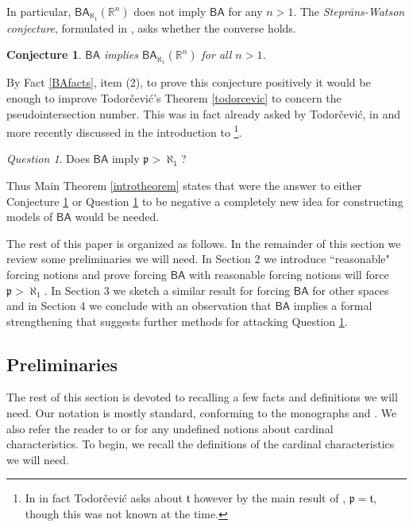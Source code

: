 \documentclass[leqno,11pt]{amsart}
\newtheorem{conjecture}{Conjecture}[section]
\theoremstyle{definition}
\theoremstyle{remark}
\newtheorem{question}{Question}
\def\BA{\mathsf{BA}}
\def\mfp{\mathfrak{p}}
\begin{document}
In particular, $\BA_{\aleph_1} (\mathbb R^n)$ does not imply $\BA$ for any $n > 1$. The {\em Stepr\=ans-Watson conjecture}, formulated in \cite{Stepranswatson87}, asks whether the converse holds.
\begin{conjecture} \label{conjecture}
  $\BA$ implies $\BA_{\aleph_1}(\mathbb R^n)$ for all $n > 1$. 
\end{conjecture}

By Fact \ref{BAfacts}, item (2), to prove this conjecture positively it would be enough to improve Todor\v{c}evi\'c's Theorem \ref{todorcevic} to concern the pseudointersection number. This was in fact already asked by Todor\v{c}evi\'c, in \cite{Todorcevic89} and more recently discussed in the introduction to \cite{TodorcevicGuzman24}\footnote{In \cite{Todorcevic89} in fact Todor\v{c}evi\'c asks about $\mathfrak{t}$ however by the main result of \cite{p=t}, $\mfp = \mathfrak{t}$, though this was not known at the time.}.
\begin{question} \label{pquestion}
    Does $\BA$ imply $\mfp > \aleph_1$?
\end{question}

Thus Main Theorem \ref{introtheorem} states that were the answer to either Conjecture \ref{conjecture} or Question \ref{pquestion} to be negative a completely new idea for constructing models of $\BA$ would be needed. 

The rest of this paper is organized as follows. In the remainder of this section we review some preliminaries we will need. In Section 2 we introduce ``reasonable" forcing notions and prove forcing $\BA$ with reasonable forcing notions will force $\mfp > \aleph_1$.  In Section 3 we sketch a similar result for forcing $\BA$ for other spaces and in Section 4 we conclude with an observation that $\BA$ implies a formal strengthening that suggests further methods for attacking Question \ref{pquestion}. 

\subsection{Preliminaries}
The rest of this section is devoted to recalling a few facts and definitions we will need. Our notation is mostly standard, conforming to the monographs \cite{JechST} and \cite{KenST}. We also refer the reader to \cite{BlassHB} or \cite{BarJu95} for any undefined notions about cardinal characteristics. To begin, we recall the definitions of the cardinal characteristics we will need.
\end{document}
